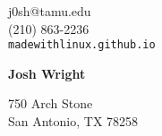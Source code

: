 \documentclass[12pt]{article}
\begin{document}
\noindent
\sffamily

\begin{minipage}{0.3\linewidth}
\begin{flushleft}
j0sh@tamu.edu\\
(210) 863-2236\\
\verb|madewithlinux.github.io|
\end{flushleft}
\end{minipage}
\hfill
\begin{minipage}{0.3\linewidth}
\begin{center}
{\Huge\textbf{Josh Wright}}
\end{center}
\end{minipage}
\hfill
\begin{minipage}{0.3\linewidth}
\begin{flushright}
750 Arch Stone\\
San Antonio, TX 78258
\end{flushright}
\end{minipage}
\end{document}
